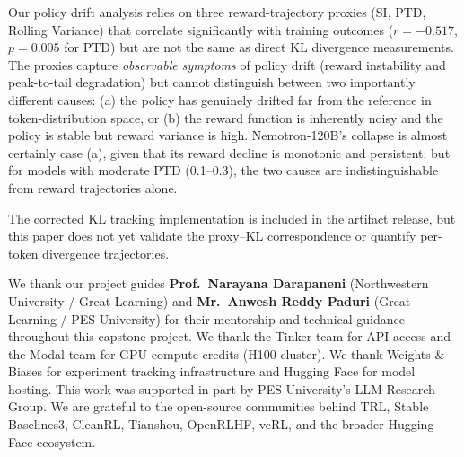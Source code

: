 \documentclass{article}
\begin{document}
Our policy drift analysis relies on three reward-trajectory proxies (SI, PTD,
Rolling Variance) that correlate significantly with training outcomes
($r = -0.517$, $p = 0.005$ for PTD) but are not the same as direct KL
divergence measurements.
The proxies capture \emph{observable symptoms} of policy drift (reward
instability and peak-to-tail degradation) but cannot distinguish between
two importantly different causes: (a) the policy has genuinely drifted far from
the reference in token-distribution space, or (b) the reward function is
inherently noisy and the policy is stable but reward variance is high.
Nemotron-120B's collapse is almost certainly case (a), given that its reward
decline is monotonic and persistent; but for models with moderate PTD (0.1--0.3),
the two causes are indistinguishable from reward trajectories alone.

The corrected KL tracking implementation is included in the artifact release,
but this paper does not yet validate the proxy--KL correspondence or quantify
per-token divergence trajectories.





\begin{ack}
\label{sec:acknowledgments}
We thank our project guides \textbf{Prof.~Narayana Darapaneni}
(Northwestern University / Great Learning) and
\textbf{Mr.~Anwesh Reddy Paduri} (Great Learning / PES University)
for their mentorship and technical guidance throughout this capstone project.
We thank the Tinker team for API access and the Modal team for GPU compute credits
(H100 cluster). We thank Weights \& Biases for experiment tracking infrastructure
and Hugging Face for model hosting. This work was supported in part by PES
University's LLM Research Group. We are grateful to the open-source communities
behind TRL, Stable Baselines3, CleanRL, Tianshou, OpenRLHF, veRL, and the
broader Hugging Face ecosystem.
\end{ack}





\appendix
\end{document}
